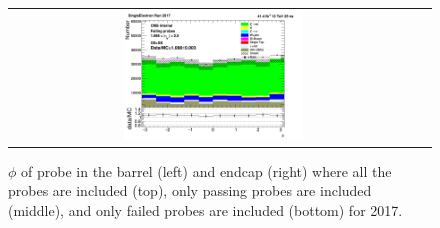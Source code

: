 \begin{figure}[htp]
\begin{center}
\begin{tabular}{cc}
      \includegraphics[width=0.45\textwidth]{figures/Zprime/2017/ScaleFactor/SameSign/nominal/stack_phi_Endcap_fail_PUW.png}
    \end{tabular}
    \caption{$\phi$ of probe in the barrel (left) and endcap (right) where all the probes are included (top), only passing probes are included (middle), and only failed probes are included (bottom) for 2017.}
    \label{fig:SS_nominal_phi_2017}
  \end{center}
\end{figure}
